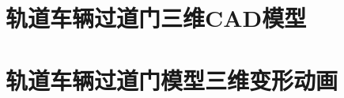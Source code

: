 \newpage
\begin{center}
    \heiti\bfseries\xiaoer{}
\end{center}
\section{轨道车辆过道门三维CAD模型}
\section{轨道车辆过道门模型三维变形动画}


